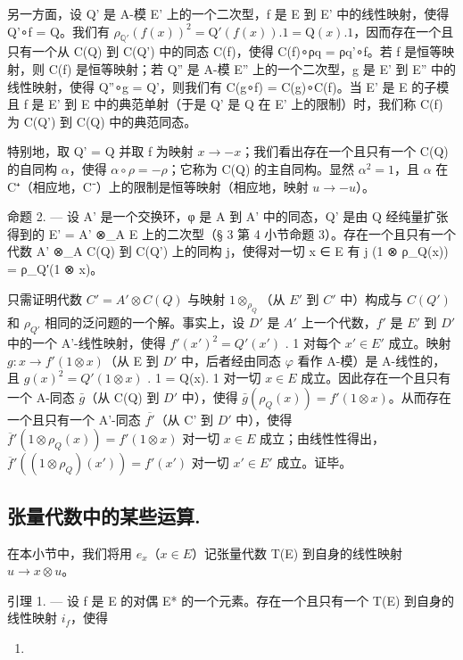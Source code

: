   另一方面，设 Q' 是 A-模 E' 上的一个二次型，f 是 E 到 E' 中的线性映射，使得 Q'∘f = Q。我们有 \(\rho_{\mathbb{Q}'}(f(x))^{2} = \mathrm{Q}'(f(x)).1 = \mathrm{Q}(x).1\)，因而存在一个且只有一个从 C(Q) 到 C(Q') 中的同态 C(f)，使得 C(f)∘ρq = ρq'∘f。若 f 是恒等映射，则 C(f) 是恒等映射；若 Q'' 是 A-模 E'' 上的一个二次型，g 是 E' 到 E'' 中的线性映射，使得 Q''∘g = Q'，则我们有 C(g∘f) = C(g)∘C(f)。当 E' 是 E 的子模且 f 是 E' 到 E 中的典范单射（于是 Q' 是 Q 在 E' 上的限制）时，我们称 C(f) 为 C(Q') 到 C(Q) 中的典范同态。

  特别地，取 Q' = Q 并取 f 为映射 \(x \to -x\)；我们看出存在一个且只有一个 C(Q) 的自同构 \(\alpha\)，使得 \(\alpha \circ \rho = -\rho\)；它称为 C(Q) 的主自同构。显然 \(\alpha^{2} = 1\)，且 \(\alpha\) 在 C⁺（相应地，C⁻）上的限制是恒等映射（相应地，映射 \(u \to -u\)）。

命题 2. --- 设 A' 是一个交换环，φ 是 A 到 A' 中的同态，Q' 是由 Q 经纯量扩张得到的 E' = A' ⊗\_A E 上的二次型（§ 3 第 4 小节命题 3）。存在一个且只有一个代数 A' ⊗\_A C(Q) 到 C(Q') 上的同构 j，使得对一切 x ∈ E 有 j (1 ⊗ ρ\_Q(x)) = ρ\_Q′(1 ⊗ x)。

  只需证明代数 \(C' = A' \otimes C(Q)\) 与映射 \(1 \otimes_{\rho_{Q}}\)（从 \(E'\) 到 \(C'\) 中）构成与 \(C(Q')\) 和 \(\rho_{Q'}\) 相同的泛问题的一个解。事实上，设 \(D'\) 是 \(A'\) 上一个代数，\(f'\) 是 \(E'\) 到 \(D'\) 中的一个 A'-线性映射，使得 \(f'(x')^{2} = Q'(x')\) . 1 对每个 \(x' \in E'\) 成立。映射 \(g : x \to f'(1 \otimes x)\)（从 E 到 \(D'\) 中，后者经由同态 \(\varphi\) 看作 A-模）是 A-线性的，且 \(g(x)^{2} = Q'(1 \otimes x)\) . 1 = Q(x). 1 对一切 \(x \in E\) 成立。因此存在一个且只有一个 A-同态 \(\bar{g}\)（从 C(Q) 到 \(D'\) 中），使得 \(\bar{g}(\rho_{Q}(x)) = f'(1 \otimes x)\)。从而存在一个且只有一个 A'-同态 \(\overline{f'}\)（从 C' 到 \(D'\) 中），使得 \(\overline{f}'(1 \otimes \rho_{Q}(x)) = f'(1 \otimes x)\) 对一切 \(x \in E\) 成立；由线性性得出，\(\overline{f}'((1 \otimes \rho_{Q})(x')) = f'(x')\) 对一切 \(x' \in E'\) 成立。证毕。

\subsection{张量代数中的某些运算.}

在本小节中，我们将用 \(e_x\)（\(x \in E\)）记张量代数 T(E) 到自身的线性映射 \(u \to x \otimes u\)。

引理 1. — 设 f 是 E 的对偶 E* 的一个元素。存在一个且只有一个 T(E) 到自身的线性映射 \(i_{f}\)，使得

\begin{enumerate}
\def\labelenumi{(\arabic{enumi})}
\setcounter{enumi}{3}
\tightlist
\item
\end{enumerate}

